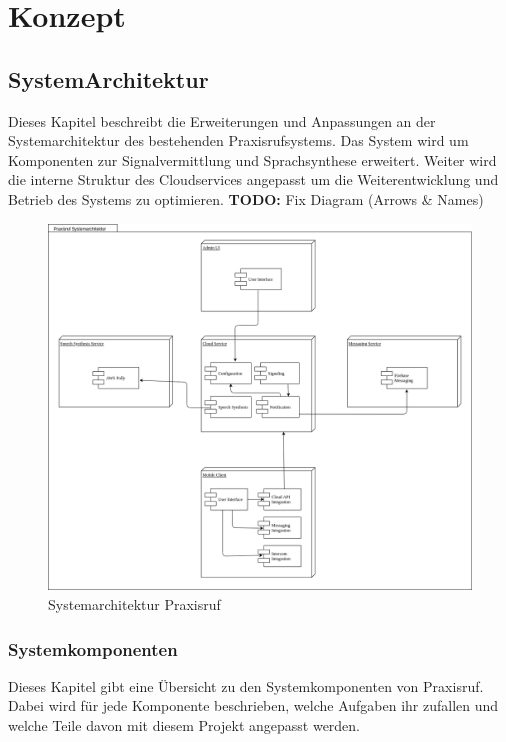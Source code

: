 \section{Konzept}

\subsection{SystemArchitektur}

Dieses Kapitel beschreibt die Erweiterungen und Anpassungen an der Systemarchitektur des bestehenden Praxisrufsystems.
Das System wird um Komponenten zur Signalvermittlung und Sprachsynthese erweitert.
Weiter wird die interne Struktur des Cloudservices angepasst um die Weiterentwicklung und Betrieb des Systems zu optimieren.
\textbf{TODO:} Fix Diagram (Arrows & Names)

\begin{figure}[h]
    \centering
    \begin{minipage}[b]{0.75\textwidth}
        \includegraphics[width=\textwidth]{graphics/diagramms/Component_System_V02}
        \caption{Systemarchitektur Praxisruf}
    \end{minipage}
\end{figure}

\subsubsection{Systemkomponenten}

Dieses Kapitel gibt eine Übersicht zu den Systemkomponenten von Praxisruf.
Dabei wird für jede Komponente beschrieben, welche Aufgaben ihr zufallen und welche Teile davon mit diesem Projekt angepasst werden.

